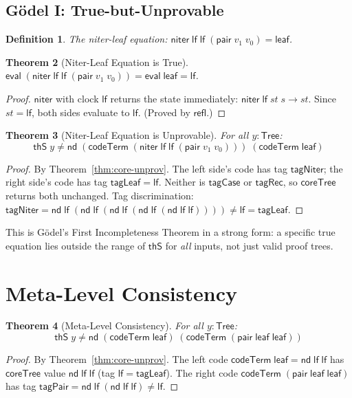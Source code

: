 \documentclass[11pt]{article}
\newtheorem{theorem}{Theorem}
\newtheorem{definition}[theorem]{Definition}
\newcommand{\lf}{\mathsf{lf}}
\newcommand{\nd}{\mathsf{nd}}
\newcommand{\niter}{\mathsf{niter}}
\newcommand{\eval}{\mathsf{eval}}
\newcommand{\codeTerm}{\mathsf{codeTerm}}
\newcommand{\thS}{\mathsf{thS}}
\newcommand{\Tree}{\mathsf{Tree}}
\newcommand{\coreTree}{\mathsf{coreTree}}
\begin{document}
\subsection{G\"odel I: True-but-Unprovable}

\begin{definition}
The \emph{niter-leaf equation}: $\niter\;\lf\;\lf\;(\mathsf{pair}\;v_1\;v_0) = \mathsf{leaf}$.
\end{definition}

\begin{theorem}[Niter-Leaf Equation is True]
$\eval\;(\niter\;\lf\;\lf\;(\mathsf{pair}\;v_1\;v_0)) = \eval\;\mathsf{leaf} = \lf$.
\end{theorem}
\begin{proof}
$\niter$ with clock $\lf$ returns the state immediately: $\niter\;\lf\;\mathit{st}\;s \to \mathit{st}$.
Since $\mathit{st} = \lf$, both sides evaluate to $\lf$. (Proved by $\mathsf{refl}$.)
\end{proof}

\begin{theorem}[Niter-Leaf Equation is Unprovable]\label{thm:godel1}
For all $y : \Tree$:
\[
  \thS\;y \neq \nd\;(\codeTerm\;(\niter\;\lf\;\lf\;(\mathsf{pair}\;v_1\;v_0)))\;(\codeTerm\;\mathsf{leaf})
\]
\end{theorem}
\begin{proof}
By Theorem~\ref{thm:core-unprov}. The left side's code has tag $\mathsf{tagNiter}$;
the right side's code has tag $\mathsf{tagLeaf} = \lf$. Neither is $\mathsf{tagCase}$
or $\mathsf{tagRec}$, so $\coreTree$ returns both unchanged. Tag discrimination:
$\mathsf{tagNiter} = \nd\;\lf\;(\nd\;\lf\;(\nd\;\lf\;(\nd\;\lf\;(\nd\;\lf\;\lf))))
\neq \lf = \mathsf{tagLeaf}$.
\end{proof}

\noindent This is G\"odel's First Incompleteness Theorem in a strong form: a specific
true equation lies outside the range of $\thS$ for \emph{all} inputs, not just
valid proof trees.

\section{Meta-Level Consistency}

\begin{theorem}[Meta-Level Consistency]\label{thm:consistency}
For all $y : \Tree$:
\[
  \thS\;y \neq \nd\;(\codeTerm\;\mathsf{leaf})\;(\codeTerm\;(\mathsf{pair}\;\mathsf{leaf}\;\mathsf{leaf}))
\]
\end{theorem}
\begin{proof}
By Theorem~\ref{thm:core-unprov}. The left code $\codeTerm\;\mathsf{leaf} =
\nd\;\lf\;\lf$ has $\coreTree$ value $\nd\;\lf\;\lf$ (tag $\lf = \mathsf{tagLeaf}$).
The right code $\codeTerm\;(\mathsf{pair}\;\mathsf{leaf}\;\mathsf{leaf})$ has
tag $\mathsf{tagPair} = \nd\;\lf\;(\nd\;\lf\;\lf) \neq \lf$.
\end{proof}
\end{document}
